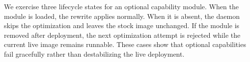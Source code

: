 We exercise three lifecycle states for an optional capability module. When the
module is loaded, the rewrite applies normally. When it is
absent, the daemon skips the optimization and leaves the stock image unchanged. If the module is
removed after deployment, the next optimization attempt is rejected while the current live image remains runnable. These cases show
that optional capabilities fail gracefully rather than destabilizing the live
deployment.

